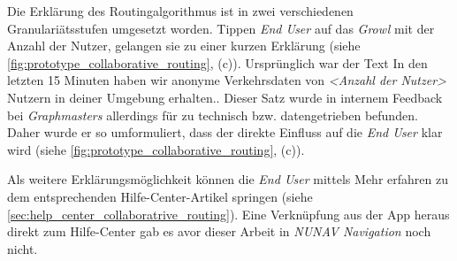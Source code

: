 Die Erklärung des Routingalgorithmus ist in zwei verschiedenen Granulariätsstufen umgesetzt worden. Tippen \textit{End User} auf das \textit{Growl} mit der Anzahl der Nutzer, gelangen sie zu einer kurzen Erklärung (siehe \autoref{fig:prototype_collaborative_routing}, (c)). Ursprünglich war der Text \glqq In den letzten 15 Minuten haben wir anonyme Verkehrsdaten von \textit{<Anzahl der Nutzer>} Nutzern in deiner Umgebung erhalten.\grqq{}. Dieser Satz wurde in internem Feedback bei \textit{Graphmasters} allerdings für zu technisch bzw. datengetrieben befunden. Daher wurde er so umformuliert, dass der direkte Einfluss auf die \textit{End User} klar wird (siehe \autoref{fig:prototype_collaborative_routing}, (c)).

Als weitere Erklärungsmöglichkeit können die \textit{End User} mittels \glqq Mehr erfahren\grqq{} zu dem entsprechenden Hilfe-Center-Artikel springen (siehe \autoref{sec:help_center_collaboratrive_routing}). Eine Verknüpfung aus der App heraus direkt zum Hilfe-Center gab es avor dieser Arbeit in \textit{NUNAV Navigation} noch nicht.

